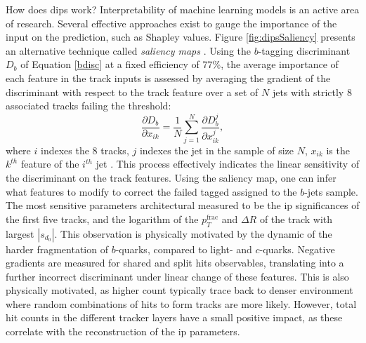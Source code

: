 How does \gls{dips} work? Interpretability of machine learning models is an active area of research. Several effective approaches exist to gauge the importance of the input on the prediction, such as Shapley values. Figure \ref{fig:dipsSaliency} presents an alternative technique called \textit{saliency maps} \cite{Simonyan2013DeepIC}. Using the $b$-tagging discriminant $D_b$ of Equation \ref{bdisc} at a fixed efficiency of 77\%, the average importance of each feature in the track inputs is assessed by averaging the gradient of the discriminant with respect to the track feature over a set of $N$ jets with strictly 8 associated tracks failing the threshold:
\begin{equation}
  \frac{\partial D_b}{\partial x_{ik}} = \frac{1}{N} \sum_{j=1}^N \frac{\partial D_b^{j}}{\partial x_{ik}^{j}},
\end{equation} 
where $i$ indexes the 8 tracks, $j$ indexes the jet in the sample of size $N$, $x_{ik}$ is the $k^{th}$ feature of the $i^{th}$ jet \cite{ATL-PHYS-PUB-2020-014}. This process effectively indicates the linear sensitivity of the discriminant on the track features. Using the saliency map, one can infer what features to modify to correct the failed tagged assigned to the $b$-jets sample. The most sensitive parameters architectural measured to be the \gls{ip} significances of the first five tracks, and the logarithm of the $p_T^{\textrm{frac}}$ and $\Delta R$ of the track with largest $|s_{d_0}|$. This observation is physically motivated by the dynamic of the harder fragmentation of $b$-quarks, compared to light- and $c$-quarks. Negative gradients are measured for shared and split hits observables, translating into a further incorrect discriminant under linear change of these features. This is also physically motivated, as higher count typically trace back to denser environment where random combinations of hits to form tracks are more likely. However, total hit counts in the different tracker layers have a small positive impact, as these correlate with the reconstruction of the \gls{ip} parameters.

